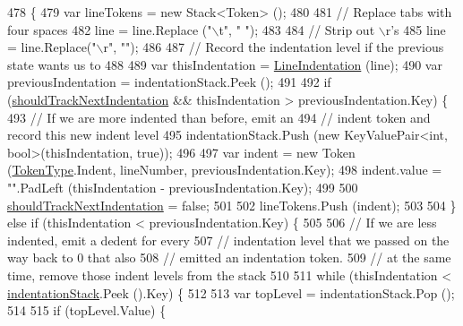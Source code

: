 \begin{DoxyCode}
478         \{
479             var lineTokens = \textcolor{keyword}{new} Stack<Token> ();
480 
481             \textcolor{comment}{// Replace tabs with four spaces}
482             line = line.Replace (\textcolor{stringliteral}{"\(\backslash\)t"}, \textcolor{stringliteral}{"    "});
483 
484             \textcolor{comment}{// Strip out \(\backslash\)r's}
485             line = line.Replace(\textcolor{stringliteral}{"\(\backslash\)r"}, \textcolor{stringliteral}{""});
486 
487             \textcolor{comment}{// Record the indentation level if the previous state wants us to}
488 
489             var thisIndentation = \hyperlink{a00047_a4079b10b099e5d85f5482f9e7eac4179}{LineIndentation} (line);
490             var previousIndentation = indentationStack.Peek ();
491 
492             \textcolor{keywordflow}{if} (\hyperlink{a00047_ac670aac2245cbd4694dfbd5b69313218}{shouldTrackNextIndentation} && thisIndentation > 
      previousIndentation.Key) \{
493                 \textcolor{comment}{// If we are more indented than before, emit an}
494                 \textcolor{comment}{// indent token and record this new indent level}
495                 indentationStack.Push (\textcolor{keyword}{new} KeyValuePair<int, bool>(thisIndentation, \textcolor{keyword}{true}));
496 
497                 var indent = \textcolor{keyword}{new} Token (\hyperlink{a00026_a301aa7c866593a5b625a8fc158bbeace}{TokenType}.Indent, lineNumber, previousIndentation.Key);
498                 indent.value = \textcolor{stringliteral}{""}.PadLeft (thisIndentation - previousIndentation.Key);
499 
500                 \hyperlink{a00047_ac670aac2245cbd4694dfbd5b69313218}{shouldTrackNextIndentation} = \textcolor{keyword}{false};
501 
502                 lineTokens.Push (indent);
503 
504             \} \textcolor{keywordflow}{else} \textcolor{keywordflow}{if} (thisIndentation < previousIndentation.Key) \{
505 
506                 \textcolor{comment}{// If we are less indented, emit a dedent for every}
507                 \textcolor{comment}{// indentation level that we passed on the way back to 0 that also}
508                 \textcolor{comment}{// emitted an indentation token.}
509                 \textcolor{comment}{// at the same time, remove those indent levels from the stack}
510 
511                 \textcolor{keywordflow}{while} (thisIndentation < \hyperlink{a00047_a6631a1b1a9109258ab18927e7587ff9b}{indentationStack}.Peek ().Key) \{
512 
513                     var topLevel = indentationStack.Pop ();
514 
515                     \textcolor{keywordflow}{if} (topLevel.Value) \{

\end{DoxyCode}
